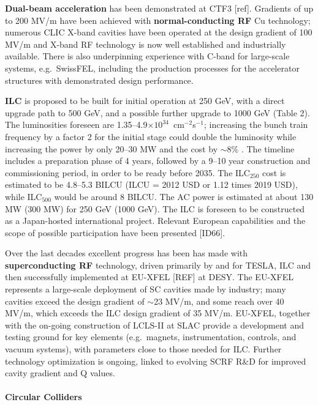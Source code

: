{\bf Dual-beam acceleration} has been demonstrated at CTF3 [ref]. Gradients of up to 200 MV/m have been achieved with {\bf normal-conducting RF} Cu technology; numerous CLIC X-band cavities have been operated at the design gradient of 100 MV/m and X-band RF technology is now well established and industrially available.  There is also underpinning experience with C-band for large-scale systems, e.g.~SwissFEL, including the production processes for the accelerator structures with demonstrated design performance. 

{\bf ILC } is proposed to be built for initial operation at 250 GeV, with a direct upgrade path to 500 GeV, and a possible further upgrade to 1000 GeV (Table 2). The luminosities foreseen are 1.35--4.9$\times 10^{34}$~cm$^{-2}$s$^{-1}$;  increasing the bunch train frequency by a factor 2 for the initial stage could double the luminosity while increasing the power by only 20--30 MW and the cost by $\sim$8\% \cite{michizono}. The timeline includes a preparation phase of 4 years, followed by a 9--10 year construction and commissioning period, in order to be ready before 2035. The ILC$_{250}$ cost is estimated to be 4.8--5.3 BILCU (ILCU = 2012 USD or 1.12 times 2019 USD), while ILC$_{500}$ would be around 8 BILCU. The AC power is estimated at about 130 MW (300 MW) for 250 GeV (1000 GeV). The ILC is foreseen to be constructed as a Japan-hosted international project. Relevant European capabilities and the scope of possible participation have been presented [ID66]. 

Over the last decades excellent progress has been has made with {\bf superconducting RF} technology, driven primarily by and for TESLA, ILC and then successfully implemented at EU-XFEL [REF] at DESY. The EU-XFEL represents a large-scale deployment of SC cavities  made by industry; many cavities exceed the design gradient of $\sim$23 MV/m, and some reach over 40 MV/m, which exceeds the ILC design gradient of 35 MV/m. EU-XFEL, together with the on-going construction of LCLS-II at SLAC provide a development and testing ground for key elements (e.g.~magnets, instrumentation, controls, and vacuum systems), with parameters close to those needed for ILC. Further technology optimization is ongoing, linked to evolving SCRF R\&D for improved cavity gradient and Q values. 
 

\paragraph*{Circular Colliders}

